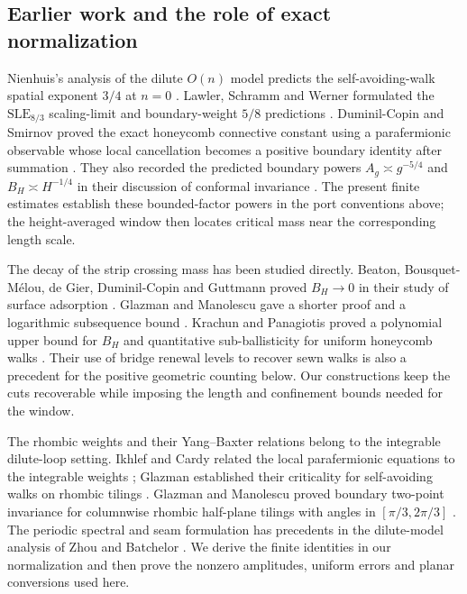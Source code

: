 \documentclass[11pt]{article}
\numberwithin{equation}{section}
\theoremstyle{definition}\newtheorem{definition}[theorem]{Definition}
\theoremstyle{remark}\newtheorem{remark}[theorem]{Remark}
\begin{document}
\subsection{Earlier work and the role of exact normalization}
Nienhuis's analysis of the dilute $O(n)$ model predicts the
self-avoiding-walk spatial exponent $3/4$ at $n=0$
\cite{Nienhuis1982}. Lawler, Schramm and Werner formulated the
$\mathrm{SLE}_{8/3}$ scaling-limit and boundary-weight $5/8$ predictions
\cite[Sections~3.3--3.4 and~4.1]{LawlerSchrammWerner2004}.
Duminil-Copin and Smirnov proved the exact honeycomb connective constant
using a parafermionic observable whose local cancellation becomes a
positive boundary identity after summation
\cite{DuminilCopinSmirnov2012}. They also recorded the predicted boundary
powers $A_g\asymp g^{-5/4}$ and $B_H\asymp H^{-1/4}$ in their discussion
of conformal invariance \cite[Section~4]{DuminilCopinSmirnov2012}.
The present finite estimates establish these bounded-factor powers in
the port conventions above; the height-averaged window then locates
critical mass near the corresponding length scale.

The decay of the strip crossing mass has been studied directly.
Beaton, Bousquet-M\'elou, de Gier, Duminil-Copin and Guttmann proved
$B_H\to0$ in their study of surface adsorption
\cite[Theorem~10]{BeatonEtAl2014}. Glazman and Manolescu gave a shorter
proof and a logarithmic subsequence bound
\cite[Proposition~1.1]{GlazmanManolescu2017}. Krachun and Panagiotis
proved a polynomial upper bound for $B_H$ and quantitative
sub-ballisticity for uniform honeycomb walks
\cite[Theorems~1--2]{KrachunPanagiotis2026}. Their use of bridge renewal
levels to recover sewn walks is also a precedent for the positive
geometric counting below. Our constructions keep the cuts recoverable
while imposing the length and confinement bounds needed for the window.

The rhombic weights and their Yang--Baxter relations belong to the
integrable dilute-loop setting. Ikhlef and Cardy related the local
parafermionic equations to the integrable weights
\cite[Section~3]{IkhlefCardy2009}; Glazman established their criticality
for self-avoiding walks on rhombic tilings
\cite[Theorems~1.1--1.2]{Glazman2015}. Glazman and Manolescu proved
boundary two-point invariance for columnwise rhombic half-plane tilings
with angles in $[\pi/3,2\pi/3]$
\cite[Theorem~1]{GlazmanManolescu2017}. The periodic spectral and seam
formulation has precedents in the dilute-model analysis of Zhou and
Batchelor \cite[Section~2]{ZhouBatchelor1997}. We derive the finite
identities in our normalization and then prove the nonzero amplitudes,
uniform errors and planar conversions used here.
\end{document}
